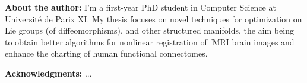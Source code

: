 \documentclass{article} %
\begin{document}
\medskip \noindent
\textbf{About the author:} I'm a first-year PhD student in Computer Science at Universit\'e de Parix XI. My thesis focuses on novel techniques for optimization on Lie groups (of diffeomorphisms), and other structured manifolds, the aim being to obtain better algorithms for nonlinear registration of fMRI brain images and enhance the charting of human functional connectomes.

\textbf{Acknowledgments:} ...
\small

% 

\end{document}
